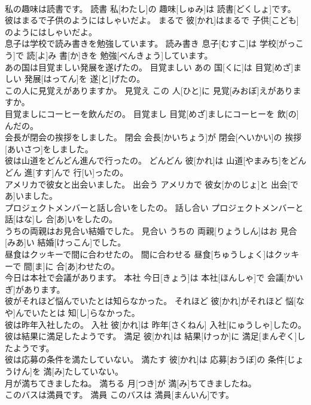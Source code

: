 \documentclass[8pt]{extreport}
\begin{document}
\begin{CJK}{UTF8}{min}
\\	私の趣味は読書です。	読書	私[わたし]の 趣味[しゅみ]は 読書[どくしょ]です。	
\\	彼はまるで子供のようにはしゃいだよ。	まるで	彼[かれ]はまるで 子供[こども]のようにはしゃいだよ。	
\\	息子は学校で読み書きを勉強しています。	読み書き	息子[むすこ]は 学校[がっこう]で 読[よ]み 書[か]きを 勉強[べんきょう]しています。	
\\	あの国は目覚ましい発展を遂げたの。	目覚ましい	あの 国[くに]は 目覚[めざ]ましい 発展[はってん]を 遂[と]げたの。	
\\	この人に見覚えがありますか。	見覚え	この 人[ひと]に 見覚[みおぼ]えがありますか。	
\\	目覚ましにコーヒーを飲んだの。	目覚まし	目覚[めざ]ましにコーヒーを 飲[の]んだの。	
\\	会長が閉会の挨拶をしました。	閉会	会長[かいちょう]が 閉会[へいかい]の 挨拶[あいさつ]をしました。	
\\	彼は山道をどんどん進んで行ったの。	どんどん	彼[かれ]は 山道[やまみち]をどんどん 進[すす]んで 行[い]ったの。	
\\	アメリカで彼女と出会いました。	出会う	アメリカで 彼女[かのじょ]と 出会[であ]いました。	
\\	プロジェクトメンバーと話し合いをしたの。	話し合い	プロジェクトメンバーと 話[はな]し 合[あ]いをしたの。	
\\	うちの両親はお見合い結婚でした。	見合い	うちの 両親[りょうしん]はお 見合[みあ]い 結婚[けっこん]でした。	
\\	昼食はクッキーで間に合わせたの。	間に合わせる	昼食[ちゅうしょく]はクッキーで 間[ま]に 合[あ]わせたの。	
\\	今日は本社で会議があります。	本社	今日[きょう]は 本社[ほんしゃ]で 会議[かいぎ]があります。	
\\	彼がそれほど悩んでいたとは知らなかった。	それほど	彼[かれ]がそれほど 悩[なや]んでいたとは 知[し]らなかった。	
\\	彼は昨年入社したの。	入社	彼[かれ]は 昨年[さくねん] 入社[にゅうしゃ]したの。	
\\	彼は結果に満足したようです。	満足	彼[かれ]は 結果[けっか]に 満足[まんぞく]したようです。	
\\	彼は応募の条件を満たしていない。	満たす	彼[かれ]は 応募[おうぼ]の 条件[じょうけん]を 満[み]たしていない。	
\\	月が満ちてきましたね。	満ちる	月[つき]が 満[み]ちてきましたね。	
\\	このバスは満員です。	満員	このバスは 満員[まんいん]です。	

\end{CJK}
\end{document}
